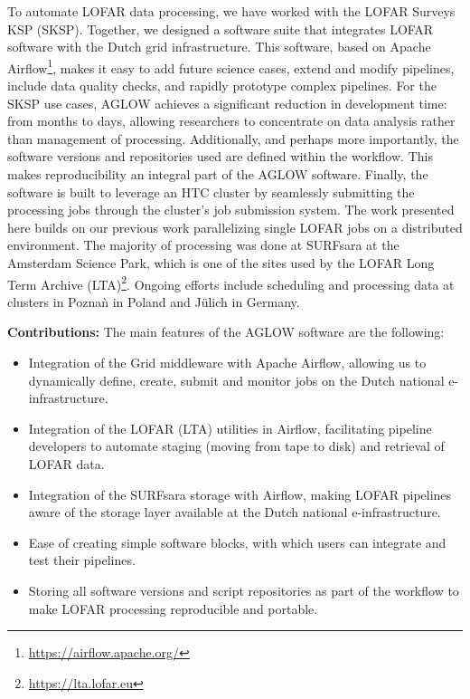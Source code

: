 To automate LOFAR data processing, we have worked with the LOFAR Surveys KSP (SKSP). Together, we designed a software suite that integrates LOFAR software\cite{cookbook} with the Dutch grid infrastructure\cite{dutchinfra}. This software, based on Apache Airflow\footnote{\url{https://airflow.apache.org/}}, makes it easy to add future science cases, extend and modify pipelines, include data quality checks, and rapidly prototype complex pipelines.  For the SKSP use cases, AGLOW achieves a significant reduction in development time: from months to days, allowing researchers to concentrate on data analysis rather than management of processing.  Additionally, and perhaps more importantly, the software versions and repositories used are defined within the workflow. This makes reproducibility an integral part of the AGLOW software.  Finally, the software is built to  leverage an HTC cluster by seamlessly submitting the processing jobs through the cluster's job submission system\cite{glite}. The work presented here builds on our previous work parallelizing single LOFAR jobs\cite{mechev17} on a distributed environment. The majority of processing was done at SURFsara at the Amsterdam Science Park\cite{SurfSara}, which is one of the sites used by the LOFAR Long Term Archive (LTA)\footnote{\url{https://lta.lofar.eu}}. Ongoing efforts include scheduling and processing data at clusters in Pozna\`{n} in Poland and J\"{u}lich in Germany. 

\textbf{Contributions:}
The main features of the AGLOW software are the following:
\begin{itemize}
\item Integration of the Grid middleware with Apache Airflow, allowing us to dynamically define, create, submit and monitor jobs on the Dutch national e-infrastructure.
\item Integration of the LOFAR (LTA) utilities in  Airflow, facilitating pipeline developers to automate staging (moving from tape to disk) and retrieval of LOFAR data.
\item Integration of the SURFsara storage with Airflow, making LOFAR pipelines aware of the storage layer available at the Dutch national e-infrastructure.  
\item Ease of creating simple software blocks, with which users can integrate and test their pipelines. 
\item Storing all software versions and script repositories as part of the workflow to make LOFAR processing reproducible and portable. 
\end{itemize}

